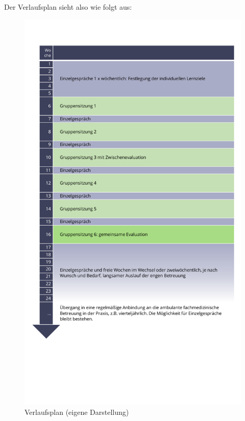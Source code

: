 \documentclass[
  twoside,
  parskip=half-,
]{scrreprt}
\begin{document}
Der Verlaufsplan sieht also wie folgt aus:

\begin{figure}[h!]
  \centering
  \includegraphics[height=0.9\textheight]{Grafiken/Ablaufplan.pdf}
  \caption{Verlaufsplan (eigene Darstellung)}
  \label{fig:ablaufplan}
\end{figure}
\end{document}

